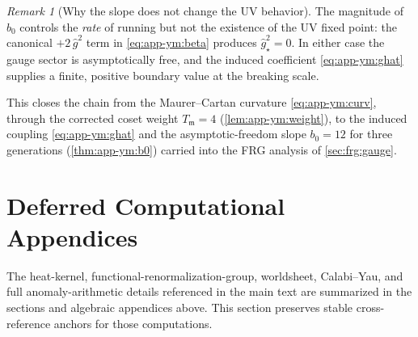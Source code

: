 \documentclass[11pt]{article}
\theoremstyle{plain}
\theoremstyle{definition}
\theoremstyle{remark}
\newtheorem{remark}[theorem]{Remark}
\newcommand{\ghat}{\hat g}
\begin{document}
\begin{remark}[Why the slope does not change the UV behavior]
\label{rem:app-ym:freedom}
The magnitude of $b_{0}$ controls the \emph{rate} of running but not the
existence of the UV fixed point: the canonical $+2\,\ghat^{2}$ term in
\eqref{eq:app-ym:beta} produces $\ghat^{2}_{\star}=0$. In either case the
gauge sector is asymptotically free, and the induced coefficient
\eqref{eq:app-ym:ghat} supplies a finite, positive boundary value at the
breaking scale.
\end{remark}

This closes the chain from the Maurer--Cartan curvature
\eqref{eq:app-ym:curv}, through the corrected coset weight
$T_{\mathfrak m}=4$ (\autoref{lem:app-ym:weight}), to the induced
coupling \eqref{eq:app-ym:ghat} and the asymptotic-freedom slope
$b_{0}=12$ for three generations (\autoref{thm:app-ym:b0}) carried into
the FRG analysis of \autoref{sec:frg:gauge}.

\section{Deferred Computational Appendices}
\label{app:gravity:main}
\label{app:frg}
\label{app:ws:main}
\label{app:cy:main}
\label{app:anomaly:main}
\label{eq:MC}
\label{eq:sigma}
The heat-kernel, functional-renormalization-group, worldsheet, Calabi--Yau,
and full anomaly-arithmetic details referenced in the main text are summarized
in the sections and algebraic appendices above. This section preserves stable
cross-reference anchors for those computations.
\end{document}
